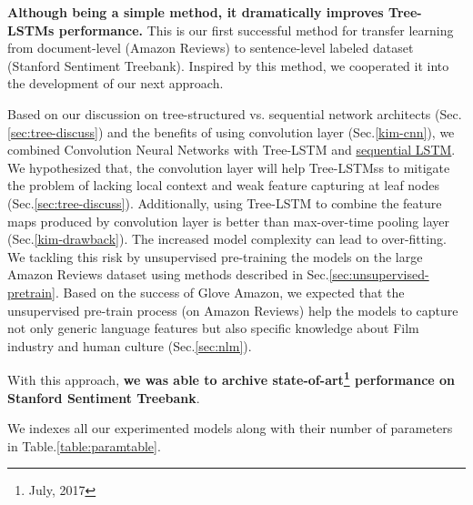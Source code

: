 \begin{description}
\textbf{Although being a simple method, it dramatically improves Tree-LSTMs performance.}
This is our first successful method for transfer learning from document-level (Amazon Reviews) to sentence-level labeled dataset (Stanford Sentiment Treebank).
Inspired by this method, we cooperated it into the development of our next approach.

\item[\deschyperlink{sec:CNNtree}{Combining Recusive Neural Networks with Convolution Neural Networks}] Based on our discussion on tree-structured vs. sequential network architects (Sec.\ref{sec:tree-discuss}) and the benefits of using convolution layer (Sec.\ref{kim-cnn}), we combined Convolution Neural Networks with Tree-LSTM and \hyperref[sec:lstm]{sequential LSTM}.
We hypothesized that, the convolution layer will help Tree-LSTMss to mitigate the problem of lacking local context and weak feature capturing at leaf nodes (Sec.\ref{sec:tree-discuss}).
Additionally, using Tree-LSTM to combine the feature maps produced by convolution layer is better than max-over-time pooling layer (Sec.\ref{kim-drawback}).
The increased model complexity can lead to over-fitting.
We tackling this risk by unsupervised pre-training the models on the large Amazon Reviews dataset using methods described in Sec.\ref{sec:unsupervised-pretrain}.
Based on the success of Glove Amazon, we expected that the unsupervised pre-train process (on Amazon Reviews) help the models to capture not only generic language features but also specific knowledge about Film industry and human culture (Sec.\ref{sec:nlm}).

With this approach, \textbf{we was able to archive state-of-art\footnote{July, 2017} performance on Stanford Sentiment Treebank}.
\end{description}

We indexes all our experimented models along with their number of parameters in Table.\ref{table:paramtable}.


